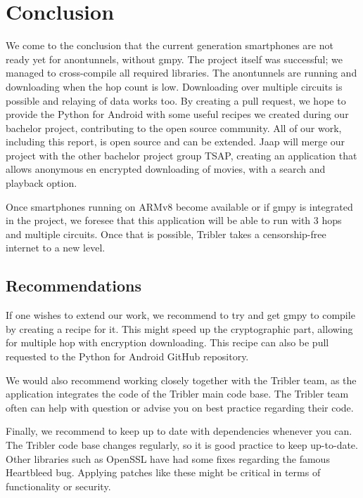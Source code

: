 \chapter{Conclusion}
	We come to the conclusion that the current generation smartphones are not ready yet for anontunnels, without gmpy. The project itself was successful; we managed to cross-compile all required libraries. The anontunnels are running and downloading when the hop count is low. Downloading over multiple circuits is possible and relaying of data works too. By creating a pull request, we hope to provide the Python for Android with some useful recipes we created during our bachelor project, contributing to the open source community. 
	All of our work, including this report, is open source and can be extended. Jaap will merge our project with the other bachelor project group TSAP, creating an application that allows anonymous en encrypted downloading of movies, with a search and playback option.
	
	
	Once smartphones running on ARMv8 become available or if gmpy is integrated in the project, we foresee that this application will be able to run with 3 hops and multiple circuits. Once that is possible, Tribler takes a censorship-free internet to a new level.
	
	\section{Recommendations}
		If one wishes to extend our work, we recommend to try and get gmpy to compile by creating a recipe for it. This might speed up the cryptographic part, allowing for multiple hop with encryption downloading. This recipe can also be pull requested to the Python for Android GitHub repository.
		
		We would also recommend working closely together with the Tribler team, as the application integrates the code of the Tribler main code base. The Tribler team often can help with question or advise you on best practice regarding their code.
		
		Finally, we recommend to keep up to date with dependencies whenever you can. The Tribler code base changes regularly, so it is good practice to keep up-to-date. Other libraries such as OpenSSL have had some fixes regarding the famous Heartbleed bug. Applying patches like these might be critical in terms of functionality or security.